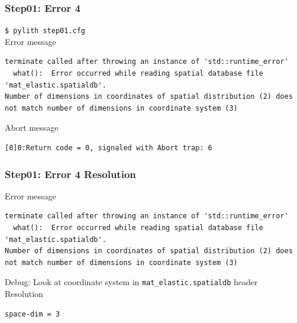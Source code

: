 \documentclass{beamer}
\newcommand{\cmd}[1]{{\tiny\tt \color{ltred}#1}}
\newcommand{\errlabel}[1]{{\small \color{blue}#1}}
\newcommand{\debuginfo}[1]{{\small \color{green}#1}}
\begin{document}
\begin{frame}[fragile]
  \frametitle{Step01: Error 4}

\cmd{\$ pylith step01.cfg}\\
\errlabel{Error message}
\begin{lstlisting}
terminate called after throwing an instance of 'std::runtime_error'
  what():  Error occurred while reading spatial database file 'mat_elastic.spatialdb'.
Number of dimensions in coordinates of spatial distribution (2) does not match number of dimensions in coordinate system (3)
\end{lstlisting}
\errlabel{Abort message}
\begin{lstlisting}
[0]0:Return code = 0, signaled with Abort trap: 6
\end{lstlisting}

\end{frame}


\begin{frame}[fragile]
  \frametitle{Step01: Error 4 Resolution}

\errlabel{Error message}
\begin{lstlisting}
terminate called after throwing an instance of 'std::runtime_error'
  what():  Error occurred while reading spatial database file 'mat_elastic.spatialdb'.
Number of dimensions in coordinates of spatial distribution (2) does not match number of dimensions in coordinate system (3)
\end{lstlisting}\pause
\errlabel{Debug:} \debuginfo{Look at coordinate system in {\tt mat\_elastic.spatialdb} header}\pause\\
\errlabel{Resolution}
\begin{lstlisting}
space-dim = 3
\end{lstlisting}

\end{frame}
\end{document}
